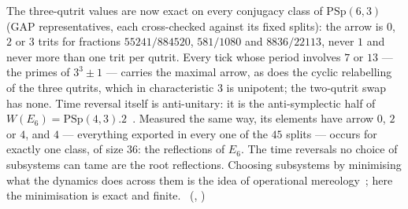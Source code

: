 The three-qutrit values are now exact on every conjugacy class of $\mathrm{PSp}(6,3)$ (GAP representatives, each
cross-checked against its fixed splits): the arrow is $0$, $2$ or $3$ trits for fractions $55241/884520$, $581/1080$
and $8836/22113$, never $1$ and never more than one trit per qutrit. Every tick whose period involves $7$ or $13$ ---
the primes of $3^3\pm1$ --- carries the maximal arrow, as does the cyclic relabelling of the three qutrits, which in
characteristic $3$ is unipotent; the two-qutrit swap has none. Time reversal itself is anti-unitary: it is the
anti-symplectic half of $W(E_6)=\mathrm{PSp}(4,3).2$~\cite{Appleby2005,Planat2011}. Measured the same way, its
elements have arrow $0$, $2$ or $4$, and $4$ --- everything exported in every one of the $45$ splits --- occurs for
exactly one class, of size $36$: the reflections of $E_6$. The time reversals no choice of subsystems can tame are the
root reflections. Choosing subsystems by minimising what the dynamics does across them is the idea of operational
mereology~\cite{ZanardiMereology2024}; here the minimisation is exact and finite. \tierT\,\tierC
(, )

